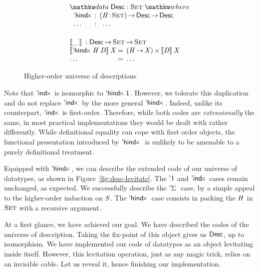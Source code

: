 \begin{figure}

\[\stk{
\begin{array}{ll}
\stk{
\data \Desc : \Set \where \\
\;\;\begin{array}{@{}l@{\::\:\:}l@{\quad}l}
    \DHindx{\!}{\!} & \PI{\V{H}}{\Set} \Desc \To \Desc \\
    \ldots          & \:\:\ldots
\end{array}
}
\vspace{0.2in}
\\
\stk{
\descop{\_\:}{} : \Desc \To \Set \To \Set \\
\begin{array}{@{}l@{\:=\:\:}ll}
\descop{\DHindx{\V{H}}{\V{D}}}{\V{X}}     &  \TIMES{(\V{H} \To \V{X})}{\descop{\V{D}}{\V{X}}} \\
\ldots                                    &  \ldots 
\end{array}
}
\end{array}
}\]

\caption{Higher-order universe of descriptions}
\label{fig:hindx_desc}

\end{figure}


Note that $\DIndx{\!}$ is isomorphic to $\DHindx{\Unit}{\!}$. However,
we tolerate this duplication and do not replace $\DIndx{\!}$ by the
more general $\DHindx{\!}{\!}$. Indeed, unlike its counterpart,
$\DIndx{\!}$ is first-order. Therefore, while both codes are
\emph{extensionally} the same, in most practical implementations they
would be dealt with rather differently. While definitional equality
can cope with first order objects, the functional presentation
introduced by $\DHindx{\!}{}$ is unlikely to be amenable to a purely
definitional treatment.

Equipped with $\DHindx{\!}{\!}$, we can describe the extended code of
our universe of datatypes, as shown in
Figure~\ref{fig:desc-levitate}.  The $\DUnit$ and $\DIndx{\!}$ cases
remain unchanged, as expected. We successfully describe the
$\DSigma{\!}{}$ case, by a simple appeal to the higher-order induction
on $\V{S}$. The $\DHindx{\!}{\!}$ case consists in packing the $\V{H}$
in $\Set$ with a recursive argument.

At a first glance, we have achieved our goal. We have described the
codes of the universe of description. Taking the fix-point of this
object gives us $\Desc$, up to isomorphism. We have implemented our
code of datatypes as an object levitating inside itself. However,
this levitation operation, just as any magic trick, relies on an
invisible cable. Let us reveal it, hence finishing our implementation.


